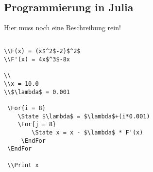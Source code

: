\subsection{Programmierung in Julia}

Hier muss noch eine Beschreibung rein!

\begin{verbatim}

\\F(x) = (x$^2$-2)$^2$
\\F'(x) = 4x$^3$-8x

\\
\\x = 10.0
\\$\lambda$ = 0.001

 \For{i = 8}
 	\State $\lambda$ = $\lambda$+(i*0.001)
	\For{j = 8}
		\State x = x - $\lambda$ * F'(x)
	 \EndFor
 \EndFor
 
 \\Print x
\end{verbatim}